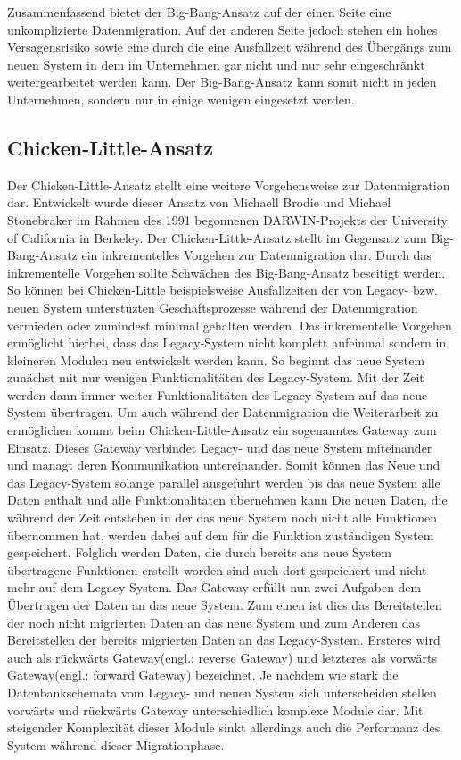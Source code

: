 \lb
Zusammenfassend bietet der Big-Bang-Ansatz auf der einen Seite eine unkomplizierte Datenmigration. Auf der anderen Seite jedoch stehen ein hohes Versagensrisiko sowie eine durch die eine Ausfallzeit während des Übergängs zum neuen System in dem im Unternehmen gar nicht und nur sehr eingeschränkt weitergearbeitet werden kann. Der Big-Bang-Ansatz kann somit nicht in jeden Unternehmen, sondern nur in einige wenigen eingesetzt werden. 

\subsection{Chicken-Little-Ansatz}

Der Chicken-Little-Ansatz stellt eine weitere Vorgehensweise zur Datenmigration dar. Entwickelt wurde dieser Ansatz von Michaell Brodie und Michael Stonebraker im Rahmen des 1991 begonnenen DARWIN-Projekts der University of California in Berkeley.\citep{zoulafy-2002} Der Chicken-Little-Ansatz stellt im Gegensatz zum Big-Bang-Ansatz ein inkrementelles Vorgehen zur Datenmigration dar. Durch das inkrementelle Vorgehen sollte Schwächen des Big-Bang-Ansatz beseitigt werden. So können bei Chicken-Little beispielsweise Ausfallzeiten der von Legacy- bzw. neuen System unterstüzten Geschäftsprozesse während der Datenmigration vermieden oder zumindest minimal gehalten werden.\citep{zoulafy-2002}
\lb
Das inkrementelle Vorgehen ermöglicht hierbei, dass das Legacy-System nicht komplett aufeinmal sondern in kleineren Modulen neu entwickelt werden kann. So beginnt das neue System zunächst mit nur wenigen Funktionalitäten des Legacy-System. Mit der Zeit werden dann immer weiter Funktionalitäten des Legacy-System auf das neue System übertragen.\citep[S. 2]{wuLawless-1997} 
\lb
Um auch während der Datenmigration die Weiterarbeit zu ermöglichen kommt beim Chicken-Little-Ansatz ein sogenanntes Gateway zum Einsatz. Dieses Gateway verbindet Legacy- und das neue System miteinander und managt deren Kommunikation untereinander. Somit können das Neue und das Legacy-System solange parallel ausgeführt werden bis das neue System alle Daten enthalt und alle Funktionalitäten übernehmen kann\citep[S. 2]{wuLawless-1997} Die neuen Daten, die während der Zeit entstehen in der das neue System noch nicht alle Funktionen übernommen hat, werden dabei auf dem für die Funktion zuständigen System gespeichert. Folglich werden Daten, die durch bereits ans neue System übertragene Funktionen erstellt worden sind auch dort gespeichert und nicht mehr auf dem Legacy-System.\citep[S. 2]{wuLawless-1997} 
\lb
Das Gateway erfüllt nun zwei Aufgaben dem Übertragen der Daten an das neue System. Zum einen ist dies das Bereitstellen der noch nicht migrierten Daten an das neue System und zum Anderen das Bereitstellen der bereits migrierten Daten an das Legacy-System. Ersteres wird auch als rückwärts Gateway(engl.: reverse Gateway) und letzteres als vorwärts Gateway(engl.: forward Gateway) bezeichnet.\citep[S. 2]{wuLawless-1997} Je nachdem wie stark die Datenbankschemata vom Legacy- und neuen System sich unterscheiden stellen vorwärts und rückwärts Gateway unterschiedlich komplexe Module dar.  Mit steigender Komplexität dieser Module sinkt allerdings auch die Performanz des System während dieser Migrationphase.\citep[S. 109]{bisbal-1999}
\lb


